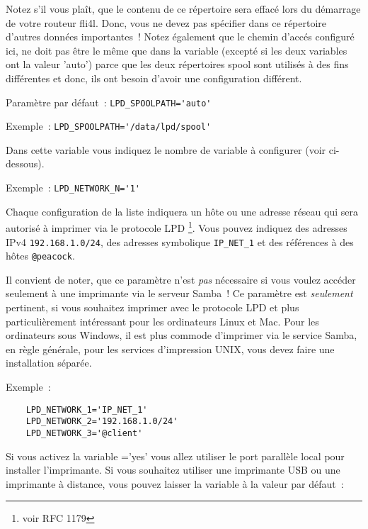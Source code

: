 \begin{description}
	Notez s'il vous plaît, que le contenu de ce répertoire sera effacé lors du démarrage
	de votre routeur fli4l. Donc, vous ne devez pas spécifier dans ce répertoire d'autres
	données importantes~! Notez également que le chemin d'accés configuré ici, ne doit pas
	être le même que dans la variable  (excepté si les deux variables
	ont la valeur 'auto') parce que les deux répertoires spool sont utilisés à des fins
	différentes et donc, ils ont besoin d'avoir une configuration différent.

    Paramètre par défaut~: \verb+LPD_SPOOLPATH='auto'+

    Exemple~: \verb+LPD_SPOOLPATH='/data/lpd/spool'+



    Dans cette variable vous indiquez le nombre de variable 
	à configurer (voir ci-dessous).

    Exemple~: \verb+LPD_NETWORK_N='1'+



    Chaque configuration de la liste indiquera un hôte ou une adresse réseau qui sera
	autorisé à imprimer via le protocole LPD \footnote{voir RFC 1179}. Vous pouvez indiquez
	des adresses IPv4 \verb+192.168.1.0/24+, des adresses symbolique \verb+IP_NET_1+ et
	des références à des hôtes \verb+@peacock+.

    Il convient de noter, que ce paramètre n'est \emph{pas} nécessaire si vous voulez
	accéder seulement à une imprimante via le serveur Samba~! Ce paramètre est
	\emph{seulement} pertinent, si vous souhaitez imprimer avec le protocole LPD et
	plus particulièrement intéressant pour les ordinateurs Linux et Mac. Pour les
	ordinateurs sous Windows, il est plus commode d'imprimer via le service Samba,
	en règle générale, pour les services d'impression UNIX, vous devez faire une
	installation séparée.

    Exemple~:
\begin{example}
\begin{verbatim}
    LPD_NETWORK_1='IP_NET_1'
    LPD_NETWORK_2='192.168.1.0/24'
    LPD_NETWORK_3='@client'
\end{verbatim}
\end{example}



    Si vous activez la variable ='yes' vous allez
    utiliser le port parallèle local pour installer l'imprimante. Si vous souhaitez
    utiliser une imprimante USB ou une imprimante à distance, vous pouvez laisser
    la variable à la valeur par défaut~:


\end{description}
